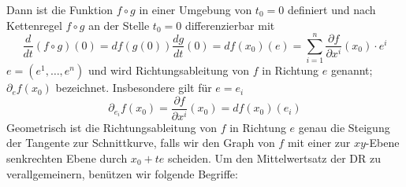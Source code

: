Dann ist die Funktion $f\circ g$ in einer Umgebung von $t_0=0$ definiert und nach Kettenregel $f\circ g$ an der Stelle $t_0=0$ differenzierbar mit
\[\frac{d}{{dt}}\left( {f \circ g} \right)\left( 0 \right) = df\left( {g\left( 0 \right)} \right)\frac{{dg}}{{dt}}\left( 0 \right) = df\left( {{x_0}} \right)\left( e \right) = \sum\limits_{i = 1}^n {\frac{{\partial f}}{{\partial {x^i}}}\left( {{x_0}} \right) \cdot {e^i}} \]
$e=\left( e^1,\dots, e^n\right) $ und wird Richtungsableitung von $f$ in Richtung $e$ genannt; $\partial_ef\left( x_0\right)$ bezeichnet. Insbesondere gilt für $e=e_i$
\[{\partial _{{e_i}}}f\left( {{x_0}} \right) = \frac{{\partial f}}{{\partial {x^i}}}\left( {{x_0}} \right) = df\left( {{x_0}} \right)\left( {{e_i}} \right)\]
Geometrisch ist die Richtungsableitung von $f$ in Richtung $e$ genau die Steigung der Tangente zur Schnittkurve, falls wir den Graph von $f$ mit einer zur $xy$-Ebene senkrechten Ebene durch $x_0+te$ scheiden.
Um den Mittelwertsatz der DR zu verallgemeinern, benützen wir folgende Begriffe:
